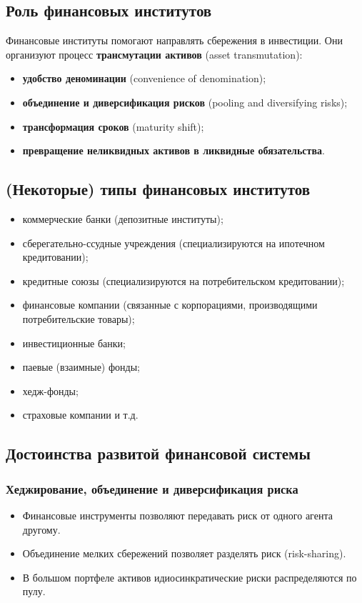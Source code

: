 \documentclass[10pt,a4paper]{article}
\begin{document}
\subsection{Роль финансовых институтов}

Финансовые институты помогают направлять сбережения в инвестиции. Они организуют процесс \textbf{трансмутации активов} (asset transmutation):
\begin{itemize}[leftmargin=1.3em]
\item \textbf{удобство деноминации} (convenience of denomination);
\item \textbf{объединение и диверсификация рисков} (pooling and diversifying risks);
\item \textbf{трансформация сроков} (maturity shift);
\item \textbf{превращение неликвидных активов в ликвидные обязательства}.
\end{itemize}

\subsection{(Некоторые) типы финансовых институтов}

\begin{itemize}[leftmargin=1.3em]
\item коммерческие банки (депозитные институты);
\item сберегательно-ссудные учреждения (специализируются на ипотечном кредитовании);
\item кредитные союзы (специализируются на потребительском кредитовании);
\item финансовые компании (связанные с корпорациями, производящими потребительские товары);
\item инвестиционные банки;
\item паевые (взаимные) фонды;
\item хедж-фонды;
\item страховые компании и т.д.
\end{itemize}

\subsection{Достоинства развитой финансовой системы}

\subsubsection{Хеджирование, объединение и диверсификация риска}
\begin{itemize}[leftmargin=1.3em]
\item Финансовые инструменты позволяют передавать риск от одного агента другому.
\item Объединение мелких сбережений позволяет разделять риск (risk-sharing).
\item В большом портфеле активов идиосинкратические риски распределяются по пулу.
\end{itemize}
\end{document}
